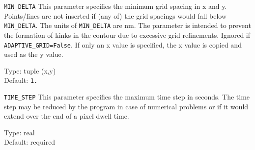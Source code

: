 \begin{keydescription}{\texttt{MIN\_DELTA}}
This parameter specifies the minimum grid spacing in x and y. Points/lines are not
inserted if (any of) the grid spacings would fall below \texttt{MIN\_DELTA}. The
units of \texttt{MIN\_DELTA} are nm. The parameter is intended to prevent the
formation of kinks in the contour due to excessive grid refinements. Ignored if
\texttt{ADAPTIVE\_GRID=False}. If only an x value is specified, the x value is copied 
and used as the y value.  
\begin{keytab}
   Type:    \> tuple (x,y) \\
   Default: \> \texttt{1.} 
\end{keytab}
\end{keydescription}

\begin{keydescription}{\texttt{TIME\_STEP}}
This parameter specifies the maximum time step in seconds. The time step may be
reduced by the program in case of numerical problems or if it would extend over
the end of a pixel dwell time.
\begin{keytab}
   Type:    \> real \\
   Default: \> required
\end{keytab}
\end{keydescription}

